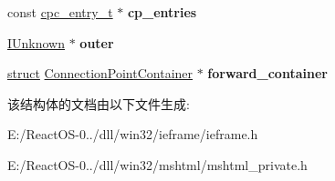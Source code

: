 \begin{DoxyCompactItemize}
const \hyperlink{structcpc__entry__t}{cpc\+\_\+entry\+\_\+t} $\ast$ {\bfseries cp\+\_\+entries}
\item 
\mbox{\label{struct_connection_point_container_a4f790eb63439211b427790f6769a47be}} 
\hyperlink{interface_i_unknown}{I\+Unknown} $\ast$ {\bfseries outer}
\item 
\mbox{\label{struct_connection_point_container_a8e015644643b96664df24b1845f1ccac}} 
\hyperlink{interfacestruct}{struct} \hyperlink{struct_connection_point_container}{Connection\+Point\+Container} $\ast$ {\bfseries forward\+\_\+container}
\end{DoxyCompactItemize}


该结构体的文档由以下文件生成\+:\begin{DoxyCompactItemize}
\item 
E\+:/\+React\+O\+S-\/0../dll/win32/ieframe/ieframe.\+h\item 
E\+:/\+React\+O\+S-\/0../dll/win32/mshtml/mshtml\+\_\+private.\+h\end{DoxyCompactItemize}
